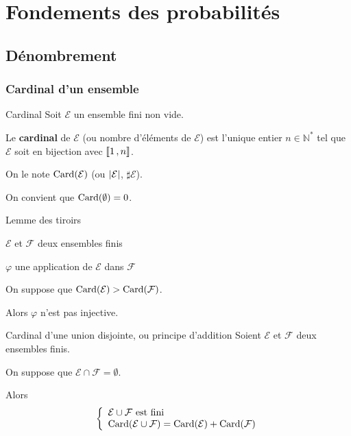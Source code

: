 
\section{Fondements des probabilités}

\subsection{Dénombrement}

    \subsubsection{Cardinal d’un ensemble}

    \begin{defi}{Cardinal}{}
        Soit $\mathcal{E}$ un ensemble fini non vide.

        Le \textbf{cardinal} de $\mathcal{E}$ (ou nombre d’éléments de $\mathcal{E}$) est l’unique entier $n \in \mathbb{N}^*$ tel que $\mathcal{E}$ soit en bijection avec $\left\llbracket 1 \, , n \right\rrbracket$. 

        On le note $\operatorname{Card}(\mathcal{E})$ (ou $\left\lvert \mathcal{E}\right\rvert$, $\sharp \mathcal{E}$). 

        On convient que $\operatorname{Card}(\emptyset) = 0$.
    \end{defi}

    \begin{lem}{Lemme des tiroirs}{}
        \begin{soient}
            \item $\mathcal{E}$ et $\mathcal{F}$ deux ensembles finis
            \item $\varphi$ une application de $\mathcal{E}$ dans $\mathcal{F}$
        \end{soient}
        On suppose que $\operatorname{Card}(\mathcal{E}) > \operatorname{Card}(\mathcal{F})$.

        Alors $\varphi$ n’est pas injective.
    \end{lem}

    \begin{prop}{Cardinal d’une union disjointe, ou principe d’addition}{}
        Soient $\mathcal{E}$ et $\mathcal{F}$ deux ensembles finis. 

        On suppose que $\mathcal{E} \cap \mathcal{F} = \emptyset$.

        Alors 
        \[ \et{\mathcal{E} \cup \mathcal{F} \text{ est fini}}{\card(\mathcal{E} \cup \mathcal{F}) = \card(\mathcal{E}) + \card(\mathcal{F})} \]
    \end{prop}

